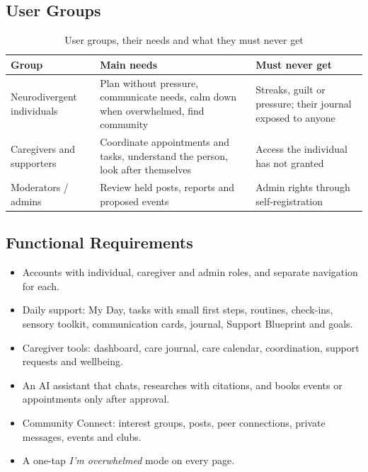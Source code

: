 \documentclass[11pt,a4paper]{article}
\begin{document}
\subsection{User Groups}
\begin{table}[H]
\centering
\caption{User groups, their needs and what they must never get}
\label{tab:users}
\small
\begin{tabularx}{\textwidth}{@{}L{3.6cm}YY@{}}
\toprule
\textbf{Group} & \textbf{Main needs} & \textbf{Must never get}\\
\midrule
Neurodivergent individuals & Plan without pressure, communicate needs, calm down when overwhelmed, find community & Streaks, guilt or pressure; their journal exposed to anyone\\
Caregivers and supporters & Coordinate appointments and tasks, understand the person, look after themselves & Access the individual has not granted\\
Moderators / admins & Review held posts, reports and proposed events & Admin rights through self-registration\\
\bottomrule
\end{tabularx}
\end{table}

\subsection{Functional Requirements}
\begin{itemize}
  \item Accounts with individual, caregiver and admin roles, and separate navigation for each.
  \item Daily support: My Day, tasks with small first steps, routines, check-ins, sensory toolkit, communication cards, journal, Support Blueprint and goals.
  \item Caregiver tools: dashboard, care journal, care calendar, coordination, support requests and wellbeing.
  \item An AI assistant that chats, researches with citations, and books events or appointments only after approval.
  \item Community Connect: interest groups, posts, peer connections, private messages, events and clubs.
  \item A one-tap \emph{I'm overwhelmed} mode on every page.
\end{itemize}
\end{document}
